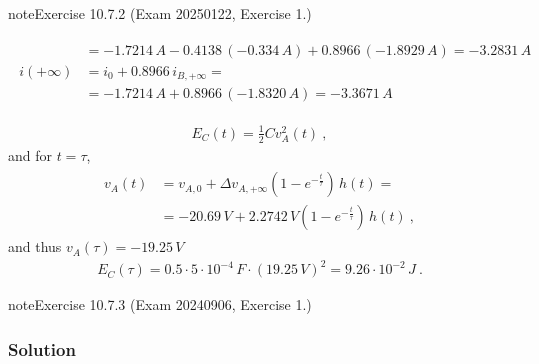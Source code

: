 \documentclass[letterpaper,10pt,italian]{jupyterBook}
\begin{document}
\begin{sphinxadmonition}{note}{Exercise 10.7.2 (Exam 2025\sphinxhyphen{}01\sphinxhyphen{}22, Exercise 1.)}
\begin{itemize}
\begin{equation*}
\begin{split}
\begin{aligned}
                & = -1.7214 \, A - 0.4138 \, (-0.334 \, A) + 0.8966 \, (-1.8929 \, A) = -3.2831 \, A \\
     i(+\infty) & = i_{0} + 0.8966 \, i_{B,+\infty} = \\ 
                & = -1.7214 \, A + 0.8966 \, (-1.8320 \, A) = - 3.3671 \, A 
   \end{aligned}\end{split}
\end{equation*}
\end{itemize}



\sphinxAtStartPar
{}
\begin{equation*}
\begin{split}E_C(t) = \frac{1}{2} C v_A^2(t) \ ,\end{split}
\end{equation*}
\sphinxAtStartPar
and for \(t = \tau\),
\begin{equation*}
\begin{split}\begin{aligned}
  v_A(t)
  & = v_{A,0} + \Delta v_{A,+\infty} \left( 1 - e^{-\frac{t}{\tau}} \right) \, h(t) = \\
  & = -20.69 \, V + 2.2742 \, V \left( 1 - e^{-\frac{t}{\tau}} \right) \, h(t) \ ,
\end{aligned}\end{split}
\end{equation*}
\sphinxAtStartPar
and thus \(v_A(\tau) = -19.25 \, V\)
\begin{equation*}
\begin{split}E_C(\tau) = 0.5 \cdot 5 \cdot 10^{-4} \, F \cdot ( 19.25 \, V )^2 = 9.26 \cdot 10^{-2} \, J \ .\end{split}
\end{equation*}\end{sphinxadmonition}
 \label{exercise:exam-24-09-06-exe-01}

\begin{sphinxadmonition}{note}{Exercise 10.7.3 (Exam 2024\sphinxhyphen{}09\sphinxhyphen{}06, Exercise 1.)}



\begin{figure}[htbp]
\centering

\noindent{}
\end{figure}
\subsubsection*{Solution}
\end{sphinxadmonition}
 \label{exercise:exam-24-07-22-exe-01}
\end{document}
